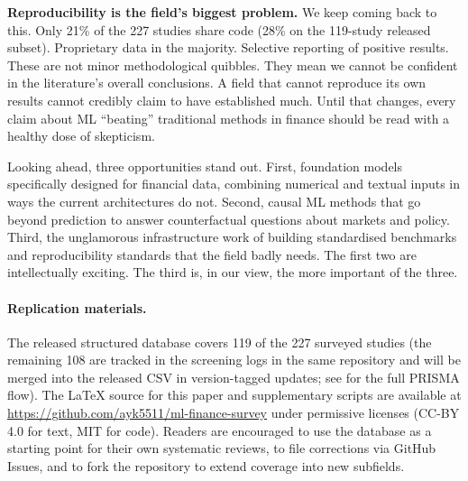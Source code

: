 \textbf{Reproducibility is the field's biggest problem.} We keep coming
back to this. Only 21\% of the 227 studies share code (28\% on the
119-study released subset). Proprietary data in the majority. Selective
reporting of positive results. These are not minor methodological
quibbles. They mean we cannot be confident in the literature's overall
conclusions. A field that cannot reproduce its own results cannot
credibly claim to have established much. Until that changes, every claim
about ML ``beating'' traditional methods in finance should be read with a
healthy dose of skepticism.

Looking ahead, three opportunities stand out. First, foundation models
specifically designed for financial data, combining numerical and textual
inputs in ways the current architectures do not. Second, causal ML
methods that go beyond prediction to answer counterfactual questions about
markets and policy. Third, the unglamorous infrastructure work of building
standardised benchmarks and reproducibility standards that the field
badly needs. The first two are intellectually exciting. The third is, in
our view, the more important of the three.

\paragraph{Replication materials.} The released structured database covers 119 of the 227 surveyed studies (the remaining 108 are tracked in the screening logs in the same repository and will be merged into the released CSV in version-tagged updates; see  for the full PRISMA flow). The LaTeX source for this paper and supplementary scripts are available at \url{https://github.com/ayk5511/ml-finance-survey} under permissive licenses (CC-BY 4.0 for text, MIT for code). Readers are encouraged to use the database as a starting point for their own systematic reviews, to file corrections via GitHub Issues, and to fork the repository to extend coverage into new subfields.
